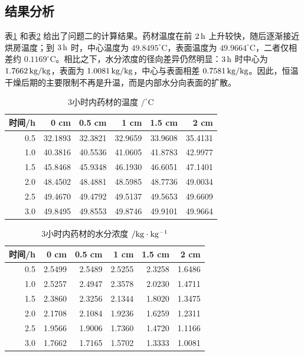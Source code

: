 \documentclass[UTF8,a4paper,12pt]{ctexart}
\begin{document}
\subsection{结果分析}
表\ref{tab:q2-temp} 和表\ref{tab:q2-moist} 给出了问题二的计算结果。药材温度在前 $2\rm\,h$ 上升较快，随后逐渐接近烘房温度；到 $3\rm\,h$ 时，中心温度为 $49.8495^\circ\mathrm C$，表面温度为 $49.9664^\circ\mathrm C$，二者仅相差约 $0.1169^\circ\mathrm C$。相比之下，水分浓度的径向差异仍然明显：$3\rm\,h$ 时中心为 $1.7662\rm\,kg/kg$，表面为 $1.0081\rm\,kg/kg$，中心与表面相差 $0.7581\rm\,kg/kg$。因此，恒温干燥后期的主要限制不再是升温，而是内部水分向表面的扩散。

\begin{table}[H]
  \centering
  \caption{3小时内药材的温度 $/^\circ\mathrm C$}
  \label{tab:q2-temp}
  \begin{tabular}{rrrrrr}
    \toprule
    时间/h & 0 cm & 0.5 cm & 1 cm & 1.5 cm & 2 cm\\ \midrule
    0.5 & 32.1893 & 32.3821 & 32.9659 & 33.9608 & 35.4131\\
    1.0 & 40.3816 & 40.5536 & 41.0605 & 41.8783 & 42.9977\\
    1.5 & 45.8468 & 45.9348 & 46.1930 & 46.6051 & 47.1401\\
    2.0 & 48.4502 & 48.4881 & 48.5985 & 48.7736 & 49.0034\\
    2.5 & 49.4670 & 49.4792 & 49.5137 & 49.5653 & 49.6609\\
    3.0 & 49.8495 & 49.8553 & 49.8746 & 49.9101 & 49.9664\\
    \bottomrule
  \end{tabular}
\end{table}

\begin{table}[H]
  \centering
  \caption{3小时内药材的水分浓度 $/\rm kg\cdot kg^{-1}$}
  \label{tab:q2-moist}
  \begin{tabular}{rrrrrr}
    \toprule
    时间/h & 0 cm & 0.5 cm & 1 cm & 1.5 cm & 2 cm\\ \midrule
    0.5 & 2.5499 & 2.5489 & 2.5255 & 2.3258 & 1.6486\\
    1.0 & 2.5257 & 2.4947 & 2.3578 & 2.0230 & 1.4711\\
    1.5 & 2.3860 & 2.3256 & 2.1344 & 1.8020 & 1.3475\\
    2.0 & 2.1708 & 2.1084 & 1.9236 & 1.6259 & 1.2311\\
    2.5 & 1.9566 & 1.9006 & 1.7360 & 1.4720 & 1.1166\\
    3.0 & 1.7662 & 1.7165 & 1.5702 & 1.3333 & 1.0081\\
    \bottomrule
  \end{tabular}
\end{table}
\end{document}
